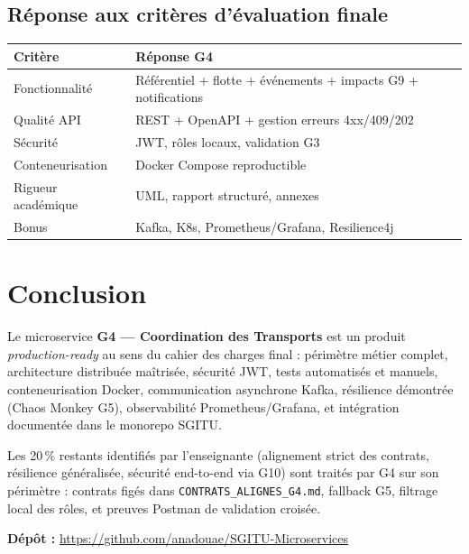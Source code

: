 \documentclass[12pt,a4paper]{report}
\begin{document}
\section{Réponse aux critères d'évaluation finale}
\begin{center}
\small
\begin{tabular}{@{}p{3.5cm}p{9.5cm}@{}}
\toprule
\textbf{Critère} & \textbf{Réponse G4} \\
\midrule
Fonctionnalité & Référentiel + flotte + événements + impacts G9 + notifications \\
Qualité API & REST + OpenAPI + gestion erreurs 4xx/409/202 \\
Sécurité & JWT, rôles locaux, validation G3 \\
Conteneurisation & Docker Compose reproductible \\
Rigueur académique & UML, rapport structuré, annexes \\
Bonus & Kafka, K8s, Prometheus/Grafana, Resilience4j \\
\bottomrule
\end{tabular}
\end{center}

\chapter*{Conclusion}

Le microservice \textbf{G4 — Coordination des Transports} est un produit \textit{production-ready} au sens du cahier des charges final : périmètre métier complet, architecture distribuée maîtrisée, sécurité JWT, tests automatisés et manuels, conteneurisation Docker, communication asynchrone Kafka, résilience démontrée (Chaos Monkey G5), observabilité Prometheus/Grafana, et intégration documentée dans le monorepo SGITU.

Les 20\,\% restants identifiés par l'enseignante (alignement strict des contrats, résilience généralisée, sécurité end-to-end via G10) sont traités par G4 sur son périmètre : contrats figés dans \texttt{CONTRATS\_ALIGNES\_G4.md}, fallback G5, filtrage local des rôles, et preuves Postman de validation croisée.

\vspace{0.4cm}
\noindent\textbf{Dépôt :} \url{https://github.com/anadouae/SGITU-Microservices}

\appendix
\end{document}
